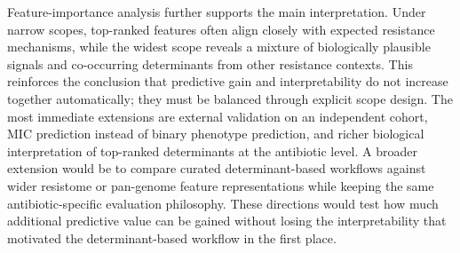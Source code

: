 Feature-importance analysis further supports the main interpretation. Under narrow scopes, top-ranked features often align closely with expected resistance mechanisms, while the widest scope reveals a mixture of biologically plausible signals and co-occurring determinants from other resistance contexts. This reinforces the conclusion that predictive gain and interpretability do not increase together automatically; they must be balanced through explicit scope design. The most immediate extensions are external validation on an independent cohort, MIC prediction instead of binary phenotype prediction, and richer biological interpretation of top-ranked determinants at the antibiotic level. A broader extension would be to compare curated determinant-based workflows against wider resistome or pan-genome feature representations while keeping the same antibiotic-specific evaluation philosophy. These directions would test how much additional predictive value can be gained without losing the interpretability that motivated the determinant-based workflow in the first place.
